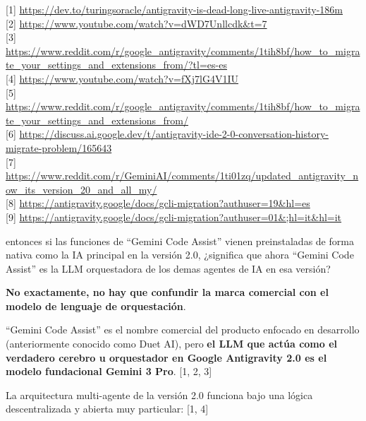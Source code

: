 \documentclass[12pt, a4paper]{article}
\begin{document}
[1] \url{https://dev.to/turingsoracle/antigravity-is-dead-long-live-antigravity-186m} \\{}
[2] \url{https://www.youtube.com/watch?v=dWD7Unllcdk&t=7} \\{}
[3] \url{https://www.reddit.com/r/google_antigravity/comments/1tih8bf/how_to_migrate_your_settings_and_extensions_from/?tl=es-es} \\{}
[4] \url{https://www.youtube.com/watch?v=fXj7lG4V1IU} \\{}
[5] \url{https://www.reddit.com/r/google_antigravity/comments/1tih8bf/how_to_migrate_your_settings_and_extensions_from/} \\{}
[6] \url{https://discuss.ai.google.dev/t/antigravity-ide-2-0-conversation-history-migrate-problem/165643} \\{}
[7] \url{https://www.reddit.com/r/GeminiAI/comments/1ti01zq/updated_antigravity_now_its_version_20_and_all_my/} \\{}
[8] \url{https://antigravity.google/docs/gcli-migration?authuser=19&hl=es} \\{}
[9] \url{https://antigravity.google/docs/gcli-migration?authuser=01&;hl=it&hl=it}

entonces si las funciones de ``Gemini Code Assist'' vienen preinstaladas de forma nativa como la IA principal en la versión 2.0, ¿significa que ahora ``Gemini Code Assist'' es la LLM orquestadora de los demas agentes de IA en esa versión?

\textbf{No exactamente, no hay que confundir la marca comercial con el modelo de lenguaje de orquestación}.

``Gemini Code Assist'' es el nombre comercial del producto enfocado en desarrollo (anteriormente conocido como Duet AI), pero \textbf{el LLM que actúa como el verdadero cerebro u orquestador en Google Antigravity 2.0 es el modelo fundacional Gemini 3 Pro}. [1, 2, 3]

La arquitectura multi-agente de la versión 2.0 funciona bajo una lógica descentralizada y abierta muy particular: [1, 4]
\end{document}
